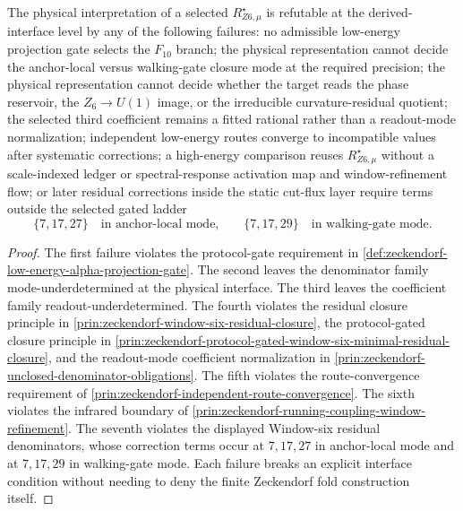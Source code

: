 \begin{theorem}
\label{thm:zeckendorf-window-six-physical-refutation-surface}
The physical interpretation of a selected \(R_{Z6,\mu}^\star\) is
refutable at the
derived-interface level by any of the following failures:
no admissible low-energy projection gate selects the \(F_{10}\) branch;
the physical representation cannot decide the anchor-local versus
walking-gate closure mode at the required precision;
the physical representation cannot decide whether the target reads the
phase reservoir, the \(Z_6\to U(1)\) image, or the irreducible
curvature-residual quotient; the
selected third coefficient remains a fitted rational rather than a
readout-mode normalization; independent low-energy routes converge to
incompatible values after systematic corrections; a high-energy
comparison reuses \(R_{Z6,\mu}^\star\) without a scale-indexed ledger or
spectral-response activation map and window-refinement flow; or later
residual corrections inside the static cut-flux layer require
terms outside the selected gated ladder
$$
  \{7,17,27\}\quad\text{in anchor-local mode,}
  \qquad
  \{7,17,29\}\quad\text{in walking-gate mode.}
$$
\end{theorem}
\begin{proof}
The first failure violates the protocol-gate requirement in
\autoref{def:zeckendorf-low-energy-alpha-projection-gate}. The second
leaves the denominator family mode-underdetermined at the physical
interface. The third leaves the coefficient family readout-underdetermined.
The fourth
violates the residual closure principle in
\autoref{prin:zeckendorf-window-six-residual-closure}, the
protocol-gated closure principle in
\autoref{prin:zeckendorf-protocol-gated-window-six-minimal-residual-closure},
and the readout-mode coefficient normalization in
\autoref{prin:zeckendorf-unclosed-denominator-obligations}. The fifth
violates the route-convergence requirement of
\autoref{prin:zeckendorf-independent-route-convergence}. The sixth
violates the infrared boundary of
\autoref{prin:zeckendorf-running-coupling-window-refinement}. The seventh
violates the displayed Window-six residual denominators, whose correction
terms occur at \(7,17,27\) in anchor-local mode and at \(7,17,29\) in
walking-gate mode. Each failure breaks an explicit interface condition
without needing to deny the finite Zeckendorf fold construction itself.
\end{proof}


